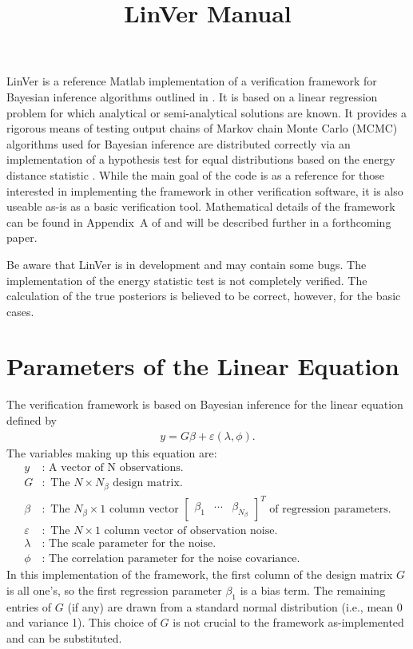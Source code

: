 \documentclass{book}
\title{LinVer Manual}
\begin{document}
\maketitle

LinVer is a reference Matlab implementation of a verification framework for Bayesian inference algorithms 
outlined
in \cite{adams01}. It is
based on a linear regression problem for which analytical or semi-analytical solutions are known.  It provides a 
rigorous means of testing output chains of Markov chain Monte Carlo (MCMC) algorithms used for 
Bayesian inference are distributed correctly
via an implementation of a hypothesis test for equal distributions based on the energy distance
statistic \cite{szekely01}. While the main goal of the code is as a reference for those interested in 
implementing the framework in other verification software, it is also useable as-is as a basic verification
tool. Mathematical details of the framework can be found in Appendix~A of \cite{adams01} and will
be described further in a forthcoming paper. 

Be aware that LinVer is in development and may contain some bugs. The implementation
of the energy statistic test is not completely verified. The calculation of the true posteriors is believed
to be correct, however, for the basic cases. 

\chapter{Parameters of the Linear Equation}
\label{chap:lineqn}
The verification framework is based on Bayesian inference for the linear equation defined by
\begin{align*}
y = G\beta + \varepsilon(\lambda, \phi).
\end{align*}
The variables making up this equation are:
\begin{align*}
y &: \text{ A vector of N observations.} \\
G &: \text{ The } N \times N_\beta \text{ design matrix.} \\
\beta &: \text{ The } N_\beta \times 1 \text{ column vector } 
	     \begin{bmatrix}\beta_1 & \cdots & \beta_{N_\beta}\end{bmatrix}^T 
	     \text{ of regression parameters.} \\
\varepsilon &: \text{ The } N \times 1 \text{ column vector of observation noise.} \\
\lambda &: \text{ The scale parameter for the noise.} \\
\phi &: \text{ The correlation parameter for the noise covariance.}
\end{align*}
In this implementation of the framework, the first column of the design matrix $G$ is all one's, so the first
regression parameter $\beta_1$ is a bias term. The remaining entries of $G$ (if any) are drawn from a
standard normal distribution (i.e., mean 0 and variance 1). This choice of $G$ is not crucial to the framework
as-implemented and can be substituted. 
\end{document}
